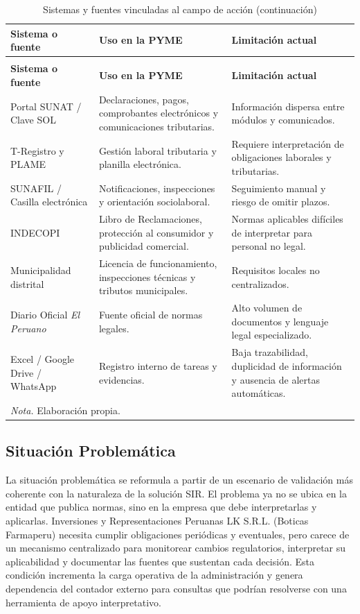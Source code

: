 \documentclass[12pt,a4paper,oneside]{report}
\begin{document}
\begin{longtable}{@{}p{}p{}p{}@{}}
\caption{Sistemas y fuentes vinculadas al campo de acción}\label{tab:sistemas-fuentes-campo}\\
\toprule
\textbf{Sistema o fuente} & \textbf{Uso en la PYME} & \textbf{Limitación actual} \\
\midrule
\endfirsthead
\caption[]{Sistemas y fuentes vinculadas al campo de acción (continuación)}\\
\toprule
\textbf{Sistema o fuente} & \textbf{Uso en la PYME} & \textbf{Limitación actual} \\
\midrule
\endhead
Portal SUNAT / Clave SOL & Declaraciones, pagos, comprobantes electrónicos y comunicaciones tributarias. & Información dispersa entre módulos y comunicados. \\
T-Registro y PLAME & Gestión laboral tributaria y planilla electrónica. & Requiere interpretación de obligaciones laborales y tributarias. \\
SUNAFIL / Casilla electrónica & Notificaciones, inspecciones y orientación sociolaboral. & Seguimiento manual y riesgo de omitir plazos. \\
INDECOPI & Libro de Reclamaciones, protección al consumidor y publicidad comercial. & Normas aplicables difíciles de interpretar para personal no legal. \\
Municipalidad distrital & Licencia de funcionamiento, inspecciones técnicas y tributos municipales. & Requisitos locales no centralizados. \\
Diario Oficial \textit{El Peruano} & Fuente oficial de normas legales. & Alto volumen de documentos y lenguaje legal especializado. \\
Excel / Google Drive / WhatsApp & Registro interno de tareas y evidencias. & Baja trazabilidad, duplicidad de información y ausencia de alertas automáticas. \\
\bottomrule
\multicolumn{3}{p{0.94\textwidth}}{\normalsize \textit{Nota.} Elaboración propia.}\\
\end{longtable}

\subsection{Situación Problemática}\label{subsec:situacion-problematica}

La situación problemática se reformula a partir de un escenario de validación más coherente con la naturaleza de la solución SIR. El problema ya no se ubica en la entidad que publica normas, sino en la empresa que debe interpretarlas y aplicarlas. Inversiones y Representaciones Peruanas LK S.R.L. (Boticas Farmaperu) necesita cumplir obligaciones periódicas y eventuales, pero carece de un mecanismo centralizado para monitorear cambios regulatorios, interpretar su aplicabilidad y documentar las fuentes que sustentan cada decisión. Esta condición incrementa la carga operativa de la administración y genera dependencia del contador externo para consultas que podrían resolverse con una herramienta de apoyo interpretativo.
\end{document}
